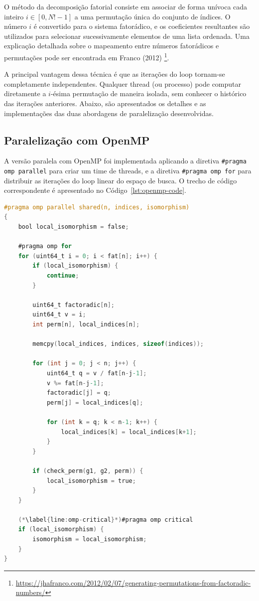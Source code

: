 \documentclass[12pt,a4paper]{article}
\begin{document}
O método da decomposição fatorial consiste em associar de forma unívoca cada inteiro $i \in [0, N! - 1]$ a uma permutação única do conjunto de índices.
O número $i$ é convertido para o sistema fatorádico,
e os coeficientes resultantes são utilizados para selecionar sucessivamente elementos de uma lista ordenada.
Uma explicação detalhada sobre o mapeamento entre números fatorádicos e permutações pode ser encontrada em Franco (2012) \footnote{\url{https://jhafranco.com/2012/02/07/generating-permutations-from-factoradic-numbers/}}.

A principal vantagem dessa técnica é que as iterações do loop tornam-se completamente independentes.
Qualquer thread (ou processo) pode computar diretamente a $i$-ésima permutação de maneira isolada,
sem conhecer o histórico das iterações anteriores.
Abaixo,
são apresentados os detalhes e as implementações das duas abordagens de paralelização desenvolvidas.

\subsection{Paralelização com OpenMP}

A versão paralela com OpenMP foi implementada aplicando a diretiva \texttt{\#pragma omp parallel} para criar um time de threads,
e a diretiva \texttt{\#pragma omp for} para distribuir as iterações do loop linear do espaço de busca.
O trecho de código correspondente é apresentado no Código~\ref{lst:openmp-code}.

\begin{lstlisting}[language=C, caption={Paralelização do loop de busca usando OpenMP com variáveis locais de thread e sincronização crítica.}, label={lst:openmp-code}]
#pragma omp parallel shared(n, indices, isomorphism)
{
    bool local_isomorphism = false;

    #pragma omp for
    for (uint64_t i = 0; i < fat[n]; i++) {
        if (local_isomorphism) {
            continue;
        }

        uint64_t factoradic[n];
        uint64_t v = i;
        int perm[n], local_indices[n];

        memcpy(local_indices, indices, sizeof(indices));

        for (int j = 0; j < n; j++) {
            uint64_t q = v / fat[n-j-1];
            v %= fat[n-j-1];
            factoradic[j] = q;
            perm[j] = local_indices[q];

            for (int k = q; k < n-1; k++) {
                local_indices[k] = local_indices[k+1];
            }
        }

        if (check_perm(g1, g2, perm)) {
            local_isomorphism = true;
        }
    }

    (*\label{line:omp-critical}*)#pragma omp critical
    if (local_isomorphism) {
        isomorphism = local_isomorphism;
    }
}
\end{lstlisting}
\end{document}
